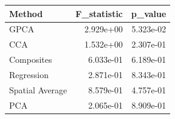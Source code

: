 \begin{tabular}{lrr}
\toprule
Method & F_statistic & p_value \\
\midrule
GPCA & 2.929e+00 & 5.323e-02 \\
CCA & 1.532e+00 & 2.307e-01 \\
Composites & 6.033e-01 & 6.189e-01 \\
Regression & 2.871e-01 & 8.343e-01 \\
Spatial Average & 8.579e-01 & 4.757e-01 \\
PCA & 2.065e-01 & 8.909e-01 \\
\bottomrule
\end{tabular}
